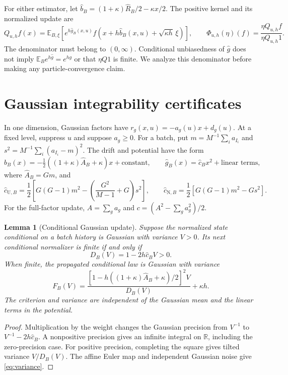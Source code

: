 \documentclass{article}
\newtheorem{lemma}[theorem]{Lemma}
\newcommand{\E}{\mathbb E}
\newcommand{\R}{\mathbb R}
\newcommand{\Uest}{\mathrm U}
\begin{document}
For either estimator, let $\widehat b_B=(1+\kappa)\widehat R_B/2-\kappa x/2$. The positive kernel and its normalized update are
\begin{equation}\label{eq:kernel}
 Q_{u,h}f(x)=\E_{B,\xi}\!\left[e^{h\widehat g_B(x,u)}
 f\!\left(x+h\widehat b_B(x,u)+\sqrt{\kappa h}\,\xi\right)\right],
 \qquad \Phi_{u,h}(\eta)(f)=\frac{\eta Q_{u,h}f}{\eta Q_{u,h}1}.
\end{equation}
The denominator must belong to $(0,\infty)$. Conditional unbiasedness of $\widehat g$ does not imply $\E_B e^{h\widehat g}=e^{hg}$ or that $\eta Q1$ is finite. We analyze this denominator before making any particle-convergence claim.

\section{Gaussian integrability certificates}
In one dimension, Gaussian factors have $r_g(x,u)=-a_g(u)x+d_g(u)$. At a fixed level, suppress $u$ and suppose $a_g\ge0$. For a batch, put $m=M^{-1}\sum_i a_{I_i}$ and $s^2=M^{-1}\sum_i(a_{I_i}-m)^2$. The drift and potential have the form
\begin{equation}\label{eq:quadratic}
 \widehat b_B(x)=-\tfrac12((1+\kappa)\widehat A_B+\kappa)x+\text{constant},
 \qquad \widehat g_B(x)=\widehat c_Bx^2+\text{linear terms},
\end{equation}
where $\widehat A_B=Gm$, and
\begin{equation}\label{eq:batch-c}
 \widehat c_{\Uest,B}=\frac12\left[G(G-1)m^2-
 \left(\frac{G^2}{M-1}+G\right)s^2\right],\qquad
 \widehat c_{\mathrm N,B}=\frac12[G(G-1)m^2-Gs^2].
\end{equation}
For the full-factor update, $A=\sum_g a_g$ and $c=(A^2-\sum_g a_g^2)/2$.

\begin{lemma}[Conditional Gaussian update]\label{lem:gaussian}
Suppose the normalized state conditional on a batch history is Gaussian with variance $V>0$. Its next conditional normalizer is finite if and only if
\begin{equation}\label{eq:D}
 D_B(V)=1-2h\widehat c_B V>0.
\end{equation}
When finite, the propagated conditional law is Gaussian with variance
\begin{equation}\label{eq:variance}
 F_B(V)=\frac{[1-h((1+\kappa)\widehat A_B+\kappa)/2]^2 V}{D_B(V)}+\kappa h.
\end{equation}
The criterion and variance are independent of the Gaussian mean and the linear terms in the potential.
\end{lemma}
\begin{proof}
Multiplication by the weight changes the Gaussian precision from $V^{-1}$ to $V^{-1}-2h\widehat c_B$. A nonpositive precision gives an infinite integral on $\R$, including the zero-precision case. For positive precision, completing the square gives tilted variance $V/D_B(V)$. The affine Euler map and independent Gaussian noise give \eqref{eq:variance}.
\end{proof}
\end{document}
